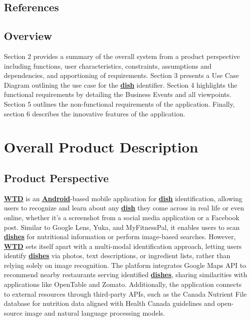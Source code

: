 \documentclass[]{article}
\begin{document}

\subsection{References}
\label{sub:references}

\renewcommand{\refname}{}  %
\vspace{-7mm}  %


\subsection{Overview}
\label{sub:overview}

Section 2 provides a summary of the overall system from a product perspective including functions, user characteristics, constraints, assumptions and dependencies, and apportioning of requirements. 
Section 3 presents a Use Case Diagram outlining the use case for the \hyperref[Dish]{\textbf{dish}} identifier.
Section 4 highlights the functional requirements by detailing the Business Events and all viewpoints.
Section 5 outlines the non-functional requirements of the application.
Finally, section 6 describes the innovative features of the application.


\section{Overall Product Description}
\label{sec:overall_description}

\subsection{Product Perspective}
\label{sub:product_perspective}

\hyperref[WTD]{\textbf{WTD}} is an \hyperref[Android]{\textbf{Android}}-based mobile application for \hyperref[Dish]{\textbf{dish}} identification, allowing users to recognize and learn about any \hyperref[dish]{\textbf{dish}} they come across in real life or even online, whether it's a screenshot from a social media application or a Facebook post. Similar to Google Lens, Yuka, and MyFitnessPal, it enables users to scan \hyperref[dish]{\textbf{dishes}} for nutritional information or perform image-based searches. However, \hyperref[WTD]{\textbf{WTD}} sets itself apart with a multi-modal identification approach, letting users identify \hyperref[Dish]{\textbf{dishes}} via photos, text descriptions, or ingredient lists, rather than relying solely on image recognition. The platform integrates Google Maps API to recommend nearby restaurants serving identified \hyperref[Dish]{\textbf{dishes}}, sharing similarities with applications like OpenTable and Zomato. Additionally, the application connects to external resources through third-party APIs, such as the Canada Nutrient File database for nutrition data aligned with Health Canada guidelines and open-source image and natural language processing models.
\end{document}
